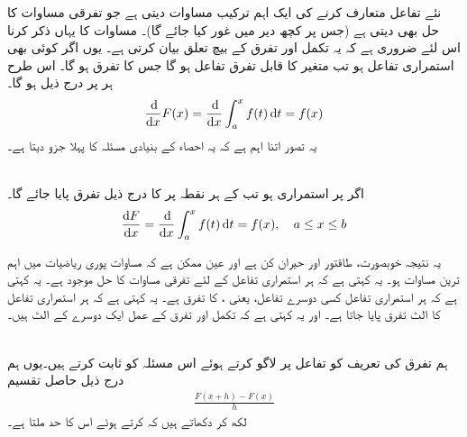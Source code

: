 نئے تفاعل متعارف کرنے کی ایک اہم ترکیب مساوات  دیتی ہے جو تفرقی مساوات کا حل بھی دیتی ہے (جس پر کچھ دیر میں غور کیا جائے گا)۔ مساوات  کا یہاں ذکر کرنا اس لئے ضروری ہے کہ یہ تکمل اور تفرق کے بیچ تعلق بیان کرتی ہے۔ یوں اگر  کوئی بھی استمراری تفاعل ہو تب  متغیر  کا قابل تفرق تفاعل ہو گا جس کا تفرق  ہو گا۔ اس طرح ہر  پر درج ذیل ہو گا۔
\begin{align*}
\frac{\dif}{\dif x}F(x)=\frac{\dif}{\dif x}\int_a^xf(t)\dif t=f(x)
\end{align*}
یہ تصور اتنا اہم ہے کہ یہ احصاء کے بنیادی مسئلہ کا پہلا جزو دیتا ہے۔

\\
اگر  پر  استمراری ہو تب  کے ہر نقطہ پر  کا درج ذیل تفرق پایا جائے گا۔
\begin{align}\label{مساوات_تکمل_بنیادی_مسئلہ_ب}
\frac{\dif F}{\dif x}=\frac{\dif}{\dif x}\int_a^xf(t)\dif t=f(x),\quad a\le x\le b
\end{align}

یہ نتیجہ خوبصورت، طاقتور اور حیران کن ہے اور عین ممکن ہے کہ مساوات  پوری ریاضیات میں اہم ترین مساوات ہو۔ یہ کہتی ہے کہ ہر استمراری تفاعل  کے لئے  تفرقی مساوات  کا حل موجود ہے۔ یہ کہتی ہے کہ ہر استمراری تفاعل  کسی دوسرے تفاعل، یعنی ، کا تفرق ہے۔ یہ کہتی ہے کہ ہر استمراری تفاعل کا الٹ تفرق پایا جاتا ہے۔ اور یہ کہتی ہے کہ تکمل اور تفرق کے عمل ایک دوسرے کے الٹ ہیں۔ 

\\
ہم تفرق کی تعریف کو تفاعل  پر لاگو کرتے ہوئے اس مسئلہ کو ثابت کرتے ہیں۔یوں  ہم درج ذیل حاصل تقسیم
\begin{align}\label{مساوات_تکمل_بنیادی_مسئلہ_پ}
\frac{F(x+h)-F(x)}{h}
\end{align}
لکھ کر دکھاتے ہیں کہ  کرتے ہوئے اس کا حد  ملتا ہے۔

